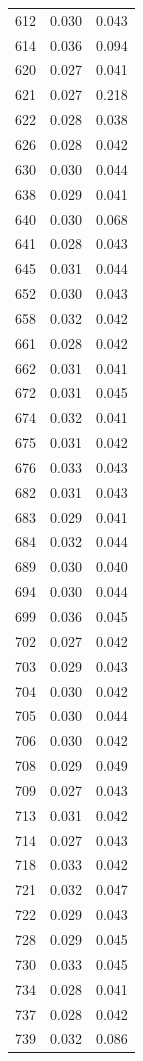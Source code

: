 \begin{tabular}{rrr}
612 & 0.030 & 0.043 \\
614 & 0.036 & 0.094 \\
620 & 0.027 & 0.041 \\
621 & 0.027 & 0.218 \\
622 & 0.028 & 0.038 \\
626 & 0.028 & 0.042 \\
630 & 0.030 & 0.044 \\
638 & 0.029 & 0.041 \\
640 & 0.030 & 0.068 \\
641 & 0.028 & 0.043 \\
645 & 0.031 & 0.044 \\
652 & 0.030 & 0.043 \\
658 & 0.032 & 0.042 \\
661 & 0.028 & 0.042 \\
662 & 0.031 & 0.041 \\
672 & 0.031 & 0.045 \\
674 & 0.032 & 0.041 \\
675 & 0.031 & 0.042 \\
676 & 0.033 & 0.043 \\
682 & 0.031 & 0.043 \\
683 & 0.029 & 0.041 \\
684 & 0.032 & 0.044 \\
689 & 0.030 & 0.040 \\
694 & 0.030 & 0.044 \\
699 & 0.036 & 0.045 \\
702 & 0.027 & 0.042 \\
703 & 0.029 & 0.043 \\
704 & 0.030 & 0.042 \\
705 & 0.030 & 0.044 \\
706 & 0.030 & 0.042 \\
708 & 0.029 & 0.049 \\
709 & 0.027 & 0.043 \\
713 & 0.031 & 0.042 \\
714 & 0.027 & 0.043 \\
718 & 0.033 & 0.042 \\
721 & 0.032 & 0.047 \\
722 & 0.029 & 0.043 \\
728 & 0.029 & 0.045 \\
730 & 0.033 & 0.045 \\
734 & 0.028 & 0.041 \\
737 & 0.028 & 0.042 \\
739 & 0.032 & 0.086 \\

\end{tabular}
